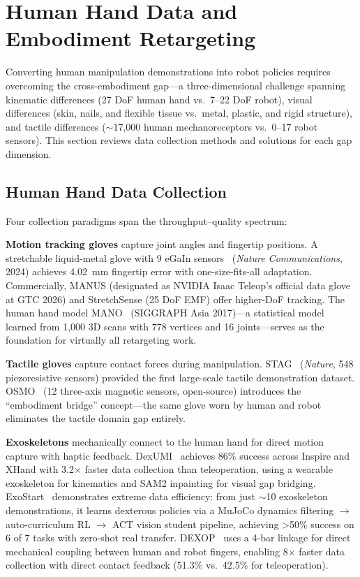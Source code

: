 \section{Human Hand Data and Embodiment Retargeting}
\label{sec:retarget}

Converting human manipulation demonstrations into robot policies requires overcoming the cross-embodiment gap---a three-dimensional challenge spanning kinematic differences (27 DoF human hand vs.\ 7--22 DoF robot), visual differences (skin, nails, and flexible tissue vs.\ metal, plastic, and rigid structure), and tactile differences ($\sim$17{,}000 human mechanoreceptors vs.\ 0--17 robot sensors). This section reviews data collection methods and solutions for each gap dimension.

\subsection{Human Hand Data Collection}

Four collection paradigms span the throughput--quality spectrum:

\textbf{Motion tracking gloves} capture joint angles and fingertip positions. A stretchable liquid-metal glove with 9 eGaIn sensors~\cite{various2024glove} (\emph{Nature Communications}, 2024) achieves 4.02~mm fingertip error with one-size-fits-all adaptation. Commercially, MANUS (designated as NVIDIA Isaac Teleop's official data glove at GTC 2026) and StretchSense (25 DoF EMF) offer higher-DoF tracking. The human hand model MANO~\cite{romero2017mano} (SIGGRAPH Asia 2017)---a statistical model learned from 1{,}000 3D scans with 778 vertices and 16 joints---serves as the foundation for virtually all retargeting work.

\textbf{Tactile gloves} capture contact forces during manipulation. STAG~\cite{sundaram2019stag} (\emph{Nature}, 548 piezoresistive sensors) provided the first large-scale tactile demonstration dataset. OSMO~\cite{yin2025osmo} (12 three-axis magnetic sensors, open-source) introduces the ``embodiment bridge'' concept---the same glove worn by human and robot eliminates the tactile domain gap entirely.

\textbf{Exoskeletons} mechanically connect to the human hand for direct motion capture with haptic feedback. DexUMI~\cite{xu2025dexumi} achieves 86\% success across Inspire and XHand with 3.2$\times$ faster data collection than teleoperation, using a wearable exoskeleton for kinematics and SAM2 inpainting for visual gap bridging. ExoStart~\cite{si2025exostart} demonstrates extreme data efficiency: from just $\sim$10 exoskeleton demonstrations, it learns dexterous policies via a MuJoCo dynamics filtering $\to$ auto-curriculum RL $\to$ ACT vision student pipeline, achieving >50\% success on 6 of 7 tasks with zero-shot real transfer. DEXOP~\cite{fang2025dexop} uses a 4-bar linkage for direct mechanical coupling between human and robot fingers, enabling 8$\times$ faster data collection with direct contact feedback (51.3\% vs.\ 42.5\% for teleoperation).


